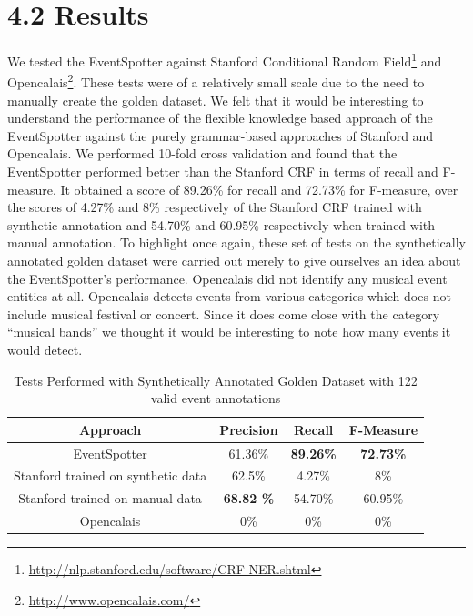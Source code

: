 \documentclass[a4paper,11pt]{report}
\begin{document}
\section*{4.2 Results}
We tested the EventSpotter against Stanford Conditional Random Field\footnote{\url{http://nlp.stanford.edu/software/CRF-NER.shtml}} and Opencalais\footnote{\url{http://www.opencalais.com/}}. These tests were of a relatively small scale due to the need to manually create the golden dataset. We felt that it would be interesting to understand the performance of the flexible knowledge based approach of the EventSpotter against the purely grammar-based approaches of Stanford and Opencalais. We performed 10-fold cross validation and found that the EventSpotter performed better than the Stanford CRF in terms of recall and F-measure. It obtained a score of 89.26\% for recall and 72.73\% for F-measure, over the scores of 4.27\% and 8\% respectively of the Stanford CRF trained with synthetic annotation and 54.70\% and 60.95\% respectively when trained with manual annotation. To highlight once again, these set of tests on the synthetically annotated golden dataset were carried out merely to give ourselves an idea about the EventSpotter's performance. Opencalais did not identify any musical event entities at all. Opencalais detects events from various categories which does not include musical festival or concert. Since it does come close with the category ``musical bands'' we thought it would be interesting to note how many events it would detect.
\begin{table}[ht]
\caption{Tests Performed with Synthetically Annotated Golden Dataset with 122 valid event annotations} %
\centering %
\begin{tabular}{c c c c} %
\hline\hline %
Approach & Precision & Recall & F-Measure \\ [0.5ex] %
\hline %
EventSpotter & 61.36\% & \bf 89.26\% \bf & \bf 72.73\% \bf \\ %
Stanford trained on synthetic data & 62.5\% & 4.27\% & 8\%\\
Stanford trained on manual data & \bf 68.82 \bf \% & 54.70\% & 60.95\% \\
Opencalais & 0\% & 0\% & 0\% \\
\hline %
\end{tabular}
\label{table:nonlin} %
\end{table}
\end{document}
